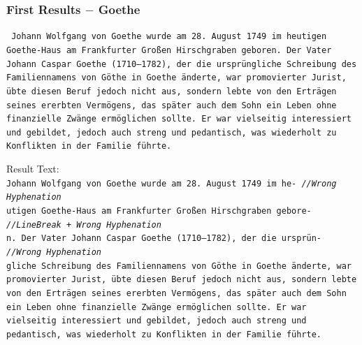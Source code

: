 \documentclass{beamer}
\begin{document}
\begin{frame}
\frametitle{First Results $-$ Goethe}
\texttt{\tiny
Johann Wolfgang von Goethe wurde am 28. August 1749 im heutigen \\
Goethe-Haus am Frankfurter Großen Hirschgraben geboren. Der Vater \\
Johann Caspar Goethe (1710–1782), der die ursprüngliche Schreibung des \\
Familiennamens von Göthe in Goethe änderte, war promovierter Jurist, \\
übte diesen Beruf jedoch nicht aus, sondern lebte von den Erträgen \\
seines ererbten Vermögens, das später auch dem Sohn ein Leben ohne \\
finanzielle Zwänge ermöglichen sollte. Er war vielseitig interessiert \\
und gebildet, jedoch auch streng und pedantisch, was wiederholt zu \\
Konflikten in der Familie führte. \\
}

Result Text: \\

\texttt{\scriptsize{J}\tiny ohann Wolfgang von Goethe wurde am 28. August 1749 im he- \hskip 16pt \emph{//Wrong Hyphenation} \\
\scriptsize{u}\tiny tigen Goethe-Haus am Frankfurter Großen Hirschgraben gebore- \hskip 10pt \emph{//LineBreak + Wrong Hyphenation} \\
\scriptsize{n}\tiny . Der Vater Johann Caspar Goethe (1710–1782), der die ursprün- \emph{//Wrong Hyphenation} \\
\scriptsize{g}\tiny liche Schreibung des Familiennamens von Göthe in Goethe änderte, war \\
promovierter Jurist, übte diesen Beruf jedoch nicht aus, sondern lebte \\
von den Erträgen seines ererbten Vermögens, das später auch dem Sohn \\
ein Leben ohne finanzielle Zwänge ermöglichen sollte. Er war \\
vielseitig interessiert und gebildet, jedoch auch streng und \\
pedantisch, was wiederholt zu Konflikten in der Familie führte. \\
}
\end{frame}
\end{document}
